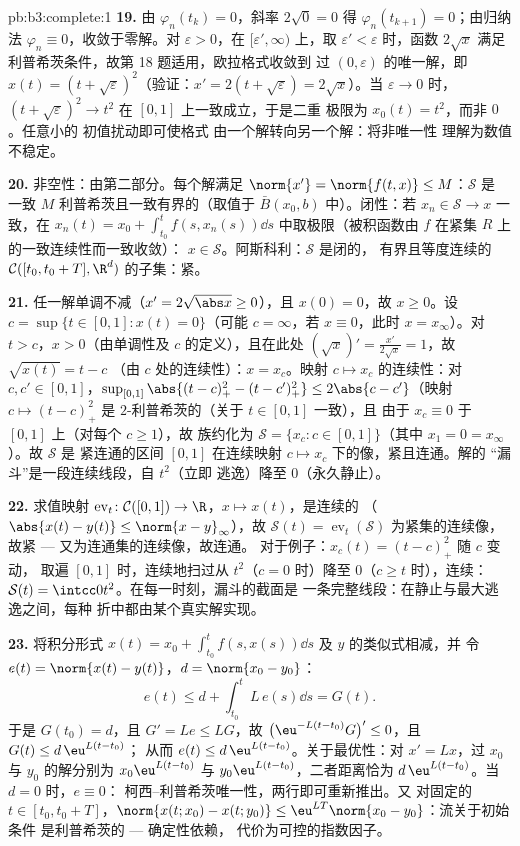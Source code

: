 \begin{solution}{pb:b3:complete:1}
\textbf{19.} 由 $\varphi_n(t_k) = 0$，斜率 $2\sqrt0 =
0$ 得 $\varphi_n(t_{k+1}) = 0$；由归纳法 $\varphi_n
\equiv 0$，收敛于零解。对
$\varepsilon > 0$，在 $[\varepsilon', \infty)$ 上，取
$\varepsilon' < \varepsilon$ 时，函数 $2\sqrt x$ 满足
利普希茨条件，故第 18 题适用，欧拉格式收敛到
过 $(0, \varepsilon)$ 的唯一解，即 $x(t) =
(t + \sqrt\varepsilon)^2$（验证：$x' = 2(t + \sqrt
\varepsilon) = 2\sqrt x$）。当 $\varepsilon \to 0$ 时，$(t +
\sqrt\varepsilon)^2 \to t^2$ 在 $[0,1]$ 上一致成立，于是二重
极限为 $x_0(t) = t^2$，而非 $0$。任意小的
初值扰动即可使格式
由一个解转向另一个解：将非唯一性
理解为数值不稳定。

\textbf{20.} 非空性：由第二部分。每个解满足
$\norm{x'} = \norm{f(t, x)} \leq M$：$\mathcal S$ 是
一致 $M$ 利普希茨且一致有界的（取值于
$\bar B(x_0, b)$ 中）。闭性：若 $x_n \in \mathcal S \to x$
一致，在 $x_n(t) = x_0 +
\int_{t_0}^tf(s, x_n(s))\dd s$ 中取极限（被积函数由
$f$ 在紧集 $R$ 上的一致连续性而一致收敛）：
$x \in \mathcal S$。阿斯科利：$\mathcal S$ 是闭的，
有界且等度连续的 $\mathcal C([t_0, t_0+T],
\R^d)$ 的子集：紧。

\textbf{21.} 任一解单调不减（$x' = 2\sqrt{\abs
x} \geq 0$），且 $x(0) = 0$，故 $x \geq 0$。设 $c =
\sup\{t \in [0,1] : x(t) = 0\}$（可能 $c = \infty$，若
$x \equiv 0$，此时 $x = x_\infty$）。对 $t > c$，$x
> 0$（由单调性及 $c$ 的定义），且在此处 $(\sqrt
x)' = \frac{x'}{2\sqrt x} = 1$，故 $\sqrt{x(t)} = t - c$
（由 $c$ 处的连续性）：$x = x_c$。映射 $c \mapsto
x_c$ 的连续性：对 $c, c' \in [0, 1]$，$\sup_{[0,1]}\abs{(t - c)_+^2 -
(t - c')_+^2} \leq 2\abs{c - c'}$（映射 $c \mapsto
(t-c)_+^2$ 是 $2$-利普希茨的（关于 $t \in [0,1]$ 一致），且
由于 $x_c \equiv 0$ 于 $[0,1]$ 上（对每个 $c \geq 1$），故
族约化为 $\mathcal S = \{x_c : c \in [0,1]\}$（其中
$x_1 = 0 = x_\infty$）。故 $\mathcal S$ 是
紧连通的区间 $[0,1]$ 在连续映射 $c
\mapsto x_c$ 下的像，紧且连通。解的
“漏斗”是一段连续线段，自 $t^2$（立即
逃逸）降至 $0$（永久静止）。

\textbf{22.} 求值映射 $\operatorname{ev}_t\colon
\mathcal C([0,1]) \to \R$，$x \mapsto x(t)$，是连续的
（$\abs{x(t) - y(t)} \leq \norm{x - y}_\infty$），故 $\mathcal
S(t) = \operatorname{ev}_t(\mathcal S)$ 为紧集的连续像，
故紧 --- 又为连通集的连续像，故连通。
对于例子：$x_c(t) = (t - c)_+^2$ 随 $c$ 变动，
取遍 $[0, 1]$ 时，连续地扫过从 $t^2$（$c = 0$ 时）降至
$0$（$c \geq t$ 时），连续：$\mathcal S(t) =
\intcc0{t^2}$。在每一时刻，漏斗的截面是
一条完整线段：在静止与最大逃逸之间，每种
折中都由某个真实解实现。

\textbf{23.} 将积分形式 $x(t) = x_0 +
\int_{t_0}^tf(s, x(s))\dd s$ 及 $y$ 的类似式相减，并
令 $e(t) = \norm{x(t) - y(t)}$，$d = \norm{x_0 - y_0}$：
\[
e(t) \leq d + \int_{t_0}^tL\,e(s)\dd s = G(t).
\]
于是 $G(t_0) = d$，且 $G' = Le \leq LG$，故 $\bigl(\eu^{-L(t
- t_0)}G\bigr)' \leq 0$，且 $G(t) \leq d\,\eu^{L(t - t_0)}$；
从而 $e(t) \leq d\,\eu^{L(t-t_0)}$。关于最优性：对 $x' =
Lx$，过 $x_0$ 与 $y_0$ 的解分别为 $x_0\eu^{L(t -
t_0)}$ 与 $y_0\eu^{L(t-t_0)}$，二者距离恰为
$d\,\eu^{L(t-t_0)}$。当 $d = 0$ 时，$e \equiv 0$：
柯西--利普希茨唯一性，两行即可重新推出。又
对固定的 $t \in [t_0, t_0 + T]$，$\norm{x(t; x_0) - x(t;
y_0)} \leq \eu^{LT}\norm{x_0 - y_0}$：流关于初始条件
是利普希茨的 --- 确定性依赖，
代价为可控的指数因子。


\end{solution}
